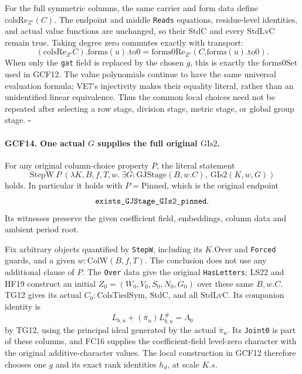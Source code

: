 \documentclass[11pt,a4paper]{article}
\numberwithin{equation}{section}
\theoremstyle{remark}\newtheorem{remark}[theorem]{Remark}
\begin{document}
For the full symmetric columns, the same carrier and form data define
\(\mathrm{colsRe}_{Z'}(C)\).  The endpoint and middle
\texttt{Reads} equations, residue-level identities, and actual value
functions are unchanged, so their \(\mathrm{StdC}\) and every
\(\mathrm{StdLvC}\) remain true.  Taking degree zero commutes
exactly with transport:
\[
  (\mathrm{colsRe}_{Z'}C).\mathrm{forms}(u).\mathrm{to0}
              =\mathrm{forms0Re}_{Z'}(C.\mathrm{forms}(u).\mathrm{to0}).
 \tag{GCF.37}
\]
When only the \texttt{gat} field is replaced by the chosen \(g\),
this is exactly the \(\mathrm{forms0Set}\) used in GCF12.
The value polynomials continue to have the same universal evaluation
formula; VE7's injectivity makes their equality literal, rather than
an unidentified linear equivalence.  Thus the common local choices
need not be repeated after selecting a row stage, division stage,
metric stage, or global group stage.
\hfill\(\square\)

\paragraph{GCF14. One actual \(G\) supplies the full original \(\mathrm{GIs2}\).}
\label{claim:GCF14}
For any original column-choice property \(P\), the literal statement
\[
 \mathrm{StepW}\ P\
  \left(\lambda K,B,f,T,w.\ \exists G:\mathrm{GJStage}(B,w.C),\
                                  \mathrm{GIs2}(K,w,G)\right)
 \tag{GCF.38}
\]
holds.  In particular it holds with \(P=\mathrm{Pinned}\), which
is the original endpoint
\[
 \texttt{exists\_\allowbreak GJStage\_\allowbreak GIs2\_\allowbreak pinned}.
\]
Its witnesses preserve the given coefficient field, embeddings,
column data and ambient period root.

Fix arbitrary objects quantified by \texttt{Step\allowbreak W}, including its
\(K.\mathrm{Over}\) and \texttt{Forced} guards, and a given
\(w:\mathrm{ColW}(B,f,T)\).  The conclusion does not use any
additional clause of \(P\).  The \texttt{Over} data give the
original \texttt{Has\allowbreak Letters}; LS22 and HF19 construct an initial
\(Z_0=(W_0,V_0,S_0,N_0,G_0)\) over these same \(B,w.C\).
TG12 gives its actual \(C_0:\mathrm{ColsTiedSym}\), \(\mathrm{StdC}\),
and all \(\mathrm{StdLvC}\).  Its companion identity is
\[
           L_{b,u}+(\bar\pi_u)L_{b,u}^{\#}=\Lambda_0
\]
by TG12, using the principal ideal generated by the actual
\(\bar\pi_u\).  Its \texttt{Joint0} is part of these columns,
and FC16 supplies the coefficient-field level-zero character with
the original additive-character values.  The local construction in
GCF12 therefore chooses one \(g\) and its exact rank identities
\(h_d\), at scale \(K.s\).
\end{document}
